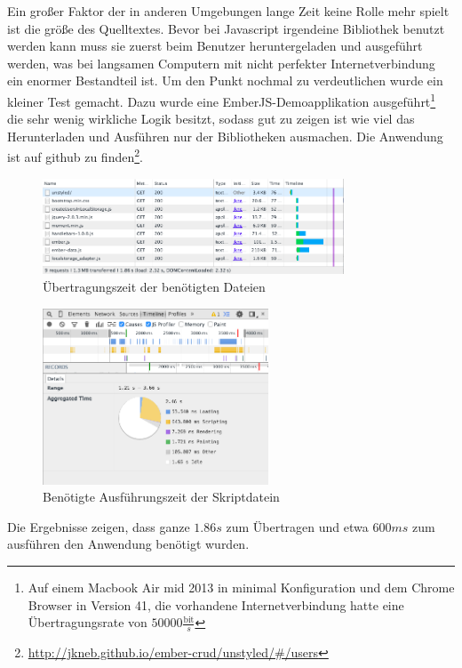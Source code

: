 \documentclass[12pt,twoside]{book}
\begin{document}
Ein großer Faktor der in anderen Umgebungen lange Zeit keine Rolle mehr spielt ist die größe des Quelltextes. Bevor bei Javascript irgendeine Bibliothek benutzt werden kann muss sie zuerst beim Benutzer heruntergeladen und ausgeführt werden, was bei langsamen Computern mit nicht perfekter Internetverbindung ein enormer Bestandteil ist. Um den Punkt nochmal zu verdeutlichen wurde ein kleiner Test gemacht. Dazu wurde eine EmberJS-Demoapplikation ausgeführt\footnote{Auf einem Macbook Air mid 2013 in minimal Konfiguration und dem Chrome Browser in Version 41, die vorhandene Internetverbindung hatte eine Übertragungsrate von $50000 \frac{\text{bit}}{s}$} die sehr wenig wirkliche Logik besitzt, sodass gut zu zeigen ist wie viel das Herunterladen und Ausführen nur der Bibliotheken ausmachen.
Die Anwendung ist auf github zu finden\footnote{\url{http://jkneb.github.io/ember-crud/unstyled/\#/users}}.
\begin{figure}[H]
    \centering
    \includegraphics[width=0.8\textwidth]{images/performance_1.png}
    \caption{Übertragungszeit der benötigten Dateien}
    \label{fig:awesome_image}
\end{figure}
\begin{figure}[H]
    \centering
    \includegraphics[width=0.6\textwidth]{images/performance_2.png}
    \caption{Benötigte Ausführungszeit der Skriptdatein}
    \label{fig:awesome_image}
\end{figure}
Die Ergebnisse zeigen, dass ganze $1.86s$ zum Übertragen und etwa $600ms$ zum ausführen den Anwendung benötigt wurden.
\end{document}
